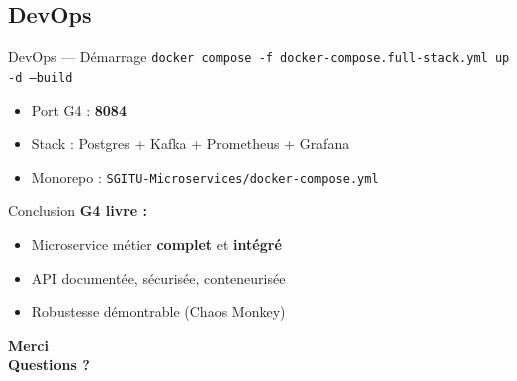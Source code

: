\documentclass[aspectratio=169,xcolor=table]{beamer}
\begin{document}
\subsection{DevOps}

\begin{frame}{DevOps — Démarrage}
  \footnotesize
  \texttt{docker compose -f docker-compose.full-stack.yml up -d --build}
  \vspace{0.3cm}
  \begin{itemize}
    \item Port G4 : \textbf{8084}
    \item Stack : Postgres + Kafka + Prometheus + Grafana
    \item Monorepo : \texttt{SGITU-Microservices/docker-compose.yml}
  \end{itemize}
\end{frame}

\begin{frame}{Conclusion}
  \textbf{G4 livre :}
  \begin{itemize}
    \item Microservice métier \textbf{complet} et \textbf{intégré}
    \item API documentée, sécurisée, conteneurisée
    \item Robustesse démontrable (Chaos Monkey)
  \end{itemize}
\end{frame}

\begin{frame}
  \centering
  \vspace{2cm}
  \textbf{\Huge Merci}
  \\
  \textbf{\Large Questions ?}
  \\
  \vspace{1cm}
  \vspace{2cm}
\end{frame}
\end{document}
